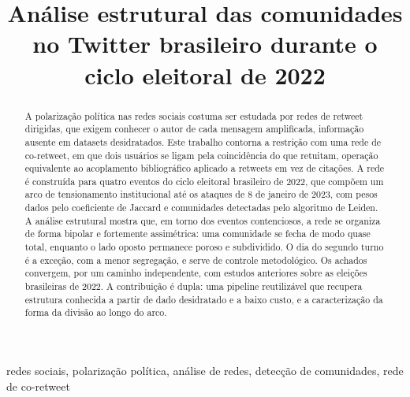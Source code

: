 \documentclass[conference]{IEEEtran}
\begin{document}
\title{Análise estrutural das comunidades no Twitter
brasileiro durante o ciclo eleitoral de 2022}

\author{
\and
{}
}

\maketitle

\begin{abstract}
A polarização política nas redes sociais costuma ser estudada por redes de retweet dirigidas, que exigem conhecer o autor de cada mensagem amplificada, informação ausente em datasets desidratados. Este trabalho contorna a restrição com uma rede de co-retweet, em que dois usuários se ligam pela coincidência do que retuitam, operação equivalente ao acoplamento bibliográfico aplicado a retweets em vez de citações. A rede é construída para quatro eventos do ciclo eleitoral brasileiro de 2022, que compõem um arco de tensionamento institucional até os ataques de 8 de janeiro de 2023, com pesos dados pelo coeficiente de Jaccard e comunidades detectadas pelo algoritmo de Leiden. A análise estrutural mostra que, em torno dos eventos contenciosos, a rede se organiza de forma bipolar e fortemente assimétrica: uma comunidade se fecha de modo quase total, enquanto o lado oposto permanece poroso e subdividido. O dia do segundo turno é a exceção, com a menor segregação, e serve de controle metodológico. Os achados convergem, por um caminho independente, com estudos anteriores sobre as eleições brasileiras de 2022. A contribuição é dupla: uma pipeline reutilizável que recupera estrutura conhecida a partir de dado desidratado e a baixo custo, e a caracterização da forma da divisão ao longo do arco.
\end{abstract}

\begin{IEEEkeywords}
redes sociais, polarização política, análise de redes, detecção de comunidades, rede de co-retweet
\end{IEEEkeywords}
\end{document}
